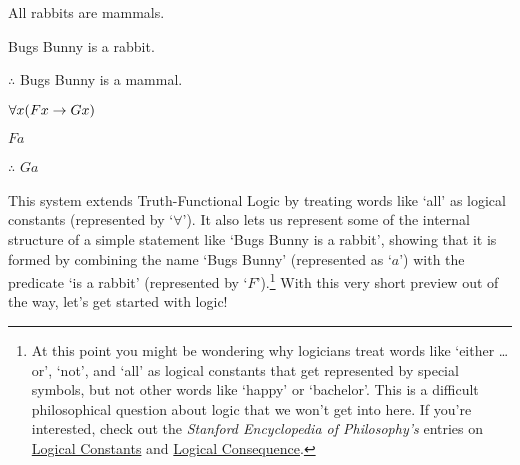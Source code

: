 \begin{multicols}{2}

\begin{earg}
\item[\eref{exarg1}]All rabbits are mammals.
\item[] Bugs Bunny is a rabbit.
\item[] $\therefore$ Bugs Bunny is a mammal.
\end{earg}

\columnbreak

	\begin{earg}
		\item[] $\forall x(Fx \rightarrow Gx)$
		\item[] $Fa$
		\item[] $\therefore$ $Ga$
	\end{earg}

\end{multicols}

\noindent This system extends Truth-Functional Logic by treating words like `all' as logical constants (represented by `$\forall$').  It also lets us represent some of the internal structure of a simple statement like `Bugs Bunny is a rabbit', showing that it is formed by combining the name `Bugs Bunny' (represented as `$a$') with the predicate `is a rabbit' (represented by `$F$').\footnote{At this point you might be wondering why logicians treat words like `either \ldots or', `not', and `all' as logical constants that get represented by special symbols, but not other words like `happy' or `bachelor'.  This is a difficult philosophical question about logic that we won't get into here.  If you're interested, check out the \emph{Stanford Encyclopedia of Philosophy's} entries on \href{http://plato.stanford.edu/entries/logical-constants/}{Logical Constants} and  \href{http://plato.stanford.edu/entries/logical-consequence/}{Logical Consequence}.} With this very short preview out of the way, let's get started with logic! 




